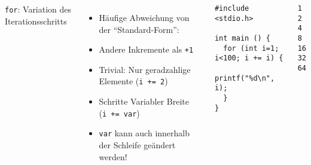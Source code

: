 \begin{frame}[fragile]
%
\begin{columns}[T]
\begin{Large}
{\texttt{for}: Variation des Iterationsschritts}
\vspace{6pt}
\end{Large}
%
\begin{itemize}
\item Häufige Abweichung von der \enquote{Standard-Form}:
\item Andere Inkremente als \texttt{+1}
\item Trivial: Nur geradzahlige Elemente  (\texttt{i += 2})
\item Schritte Variabler Breite \\
	(\texttt{i += var})
\item \texttt{var} kann auch innerhalb der Schleife geändert werden!
\end{itemize}
%
\begin{codebox}[Beispiel: Variable Schrittweite, equal height group=B]
\begin{verbatim}
#include <stdio.h>

int main () {
  for (int i=1; i<100; i += i) {
    printf("%d\n", i);
  }
}
\end{verbatim}
\end{codebox}
%
\begin{cmdbox}[Ausgabe, equal height group=B]
\begin{verbatim}
1
2
4
8
16
32
64
\end{verbatim}
\end{cmdbox}
%
\end{columns}
%
\end{frame}


